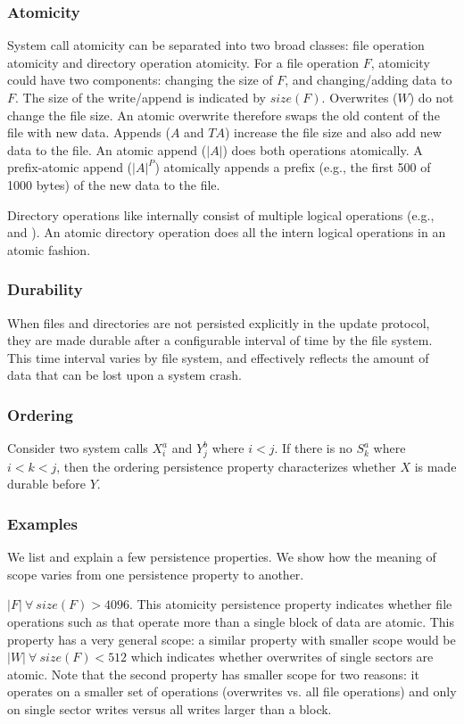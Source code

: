 \subsubsection{Atomicity}
System call atomicity can be separated into two broad classes: file operation
atomicity and directory operation atomicity. For a file operation $F$,
atomicity could have two components: changing the size of $F$, and
changing/adding data to $F$. The size of the write/append is indicated by 
$size(F)$. Overwrites ($W$) do not change the file size. An atomic overwrite
therefore swaps the old content of the file with new data. Appends ($A$ and
$TA$) increase the file size and also add new data to the file. An atomic
append ($|A|$) does both operations atomically. A prefix-atomic append
($|A|^{P}$) atomically appends a prefix (e.g., the first 500 of 1000 bytes) of
the new data to the file.     

Directory operations like  internally consist of multiple
logical operations (e.g.,  and ). An atomic
directory operation does all the intern logical operations in an atomic
fashion.

\subsubsection{Durability}
When files and directories are not persisted explicitly in the update protocol,
they are made durable after a configurable interval of time by the file
system. This time interval varies by file system, and effectively reflects the
amount of data that can be lost upon a system crash.

\subsubsection{Ordering}
Consider two system calls ${X}^{a}_i$ and ${Y}^{b}_j$ where $i < j$. If there
is no ${S}^{a}_k$ where $ i < k < j$, then the ordering persistence property
characterizes whether $X$ is made durable before $Y$.

\subsubsection{Examples}
We list and explain a few persistence properties. We show how the meaning of
scope varies from one persistence property to another. 

$|F|\ \forall\ size(F) > 4096$. This atomicity persistence property
indicates whether file operations such as  that operate more
than a single block of data are atomic. This property has a very general scope:
a similar property with smaller scope would be $|W|\ \forall\ size(F) < 512$
which indicates whether overwrites of single sectors are atomic. Note that the
second property has smaller scope for two reasons: it operates on a smaller set
of operations (overwrites vs. all file operations) and only on single sector
writes versus all writes larger than a block. 

